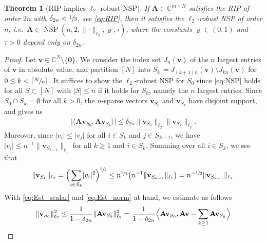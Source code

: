 \documentclass[11pt,reqno, a4paper]{article}
\numberwithin{equation}{section}
\newtheorem{theorem}{Theorem}[section]
\newcommand{\C}{\mathbb{C}}
\begin{document}
\begin{theorem}[RIP implies $\ell_2$-robust NSP]
If $\mathbf{A} \in \C^{m\times N}$ satisfies the RIP of order $2n$ with $\delta_{2n}<\sfrac{1}{3}$, see \eqref{eq:RIP}, then it satisfies the $\ell_2$-robust NSP of order $n$, i.e.\ $\mathbf{A}\in\operatorname{NSP}(n,2,\lVert\cdot\rVert_{\ell_2},\varrho,\tau)$, where the constants $\varrho \in (0,1)$ and $\tau>0$ depend only on $\delta_{2n}$.
\end{theorem}
\begin{proof}
Let $\mathbf{v} \in \C^N \setminus \{\boldsymbol{0}\}$.
We consider the index set $J_n(\mathbf{v})$ of the $n$ largest entries of $\mathbf{v}$ in absolute value, and partition $[N]$ into $S_k\coloneqq J_{(k+1)n}(\mathbf{v})\setminus J_{kn}(\mathbf{v})$ for $0\leq k<\lceil\sfrac{N}{n}\rceil$.
It suffices to show the $\ell_2$-robust NSP for $S_0$ since \eqref{eq:NSP} holds for all $S\subset[N]$ with $\lvert S\rvert \leq n$ if it holds for $S_0$, namely the $n$ largest entries.
Since $S_0\cap S_k=\emptyset$ for all $k>0$, the $n$-sparse vectors $\mathbf{v}_{S_0}$ and $\mathbf{v}_{S_k}$ have disjoint support, 
and \cite[Prop.\ 6.3]{FoRa13} gives us
\begin{gather}\label{eq:Est_scalar}
    \lvert\langle \mathbf{A}\mathbf{v}_{S_0}, \mathbf{A}\mathbf{v}_{S_k} \rangle\rvert\leq \delta_{2n} \lVert\mathbf{v}_{S_0}\rVert_{\ell_2}  \lVert\mathbf{v}_{S_k}\rVert_{\ell_2}.
\end{gather}
Moreover, since $\lvert v_i\rvert\leq\lvert v_j\rvert$ for all $i\in S_k$ and $j\in S_{k-1}$, we have $\lvert v_i\rvert \leq n^{-1}\lVert\mathbf{v}_{S_{k-1}}\rVert_{\ell_1}$ for all $k\geq 1$ and $i\in S_k$.
Summing over all $i\in S_k$, we see that
\begin{gather}\label{eq:Est_norm}
    \lVert\mathbf{v}_{S_k}\rVert_{\ell_2} = \Bigl(\sum_{i\in S_k}\lvert v_i\rvert^2 \Bigr)^{\sfrac{1}{2}} \leq n^{\sfrac{1}{2}}\big(n^{-1}\lVert\mathbf{v}_{S_{k-1}}\rVert_{\ell_1}\big)= n^{-\sfrac{1}{2}}\lVert\mathbf{v}_{S_{k-1}}\rVert_{\ell_1}.
\end{gather}
With \eqref{eq:Est_scalar} and \eqref{eq:Est_norm} at hand, we estimate as follows
\begin{align}
\begin{split}
\lVert\mathbf{v}_{S_0}\rVert_{\ell_2}^2 & \leq \frac{1}{1-\delta_{2n}}\lVert\mathbf{A}\mathbf{v}_{S_0}\rVert_{\ell_2}^2=\frac{1}{1-\delta_{2n}} \Bigl\langle \mathbf{A}\mathbf{v}_{S_0}, \mathbf{A}\mathbf{v} - \sum \limits_{k\geq 1} \mathbf{A}\mathbf{v}_{S_k}\Bigr\rangle\\

\end{split}
\end{align}
\end{proof}
\end{document}
